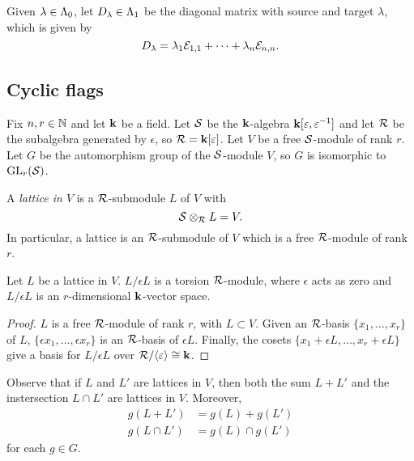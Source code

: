 \documentclass[a4paper, 11pt, twoside]{report}
\begin{document}
Given $\lambda\in\Lambda_0{}$, let $D_{\lambda}\in\Lambda_1{}$ be the diagonal matrix with source and target $\lambda$, which is given by 
\begin{equation}\label{eq:diagonal-matrices}
D_{\lambda} = \lambda_1\mathcal{E}_{1,1} +\cdots +\lambda_n\mathcal{E}_{n,n}.
\end{equation}

\subsection{Cyclic flags}

Fix $n,r\in\mathbb{N}$ and let $\mathbf{k}$ be a field. Let $\mathcal{S}$ be the $\mathbf{k}$-algebra $\mathbf{k}[\varepsilon,\varepsilon^{-1}]$ and let $\mathcal{R}$ be the subalgebra generated by $\epsilon$, so $\mathcal{R} = \mathbf{k}[\varepsilon]$. Let $V$ be a free $\mathcal{S}$-module of rank $r$. Let $G$ be the automorphism group of the $\mathcal{S}$-module $V$, so $G$ is isomorphic to $\operatorname{GL}_{r}(\mathcal{S})$.

\begin{definition}\label{definition:lattice}
A \emph{lattice in $V$} is a $\mathcal{R}$-submodule $L$ of $V$ with
\begin{equation*}
\mathcal{S}\otimes_{\mathcal{R}} L = V.
\end{equation*}
In particular, a lattice is an $\mathcal{R}$-submodule of $V$ which is a free $\mathcal{R}$-module of rank $r$.
\end{definition}

\begin{lemma}
Let $L$ be a lattice in $V$. $L/{\epsilon L}$ is a torsion $\mathcal{R}$-module, where $\epsilon$ acts as zero and $L/{\epsilon L}$ is an $r$-dimensional $\mathbf{k}$-vector space.
\end{lemma}

\begin{proof}
$L$ is a free $\mathcal{R}$-module of rank $r$, with $L\subset V$. Given an $\mathcal{R}$-basis $\{x_1,\ldots,x_r\}$ of $L$, $\{\epsilon x_1,\ldots, \epsilon x_r\}$ is an $\mathcal{R}$-basis of $\epsilon L$. Finally, the cosets $\{ x_1 + \epsilon L,\ldots, x_r + \epsilon L\}$ give a basis for $L/{\epsilon L}$ over $\mathcal{R}/{\langle \varepsilon\rangle}\cong \mathbf{k}$.
\end{proof}

Observe that if $L$ and $L'$ are lattices in $V$, then both the sum $L+L'$ and the instersection $L\cap L'$ are lattices in $V$. Moreover,
\begin{align*}
g(L+L') &= g(L) + g(L')\\
g(L\cap L') &= g(L)\cap g(L')
\end{align*}
for each $g\in G$.
\end{document}
